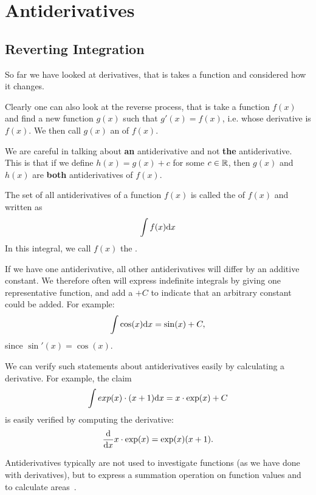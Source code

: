 \chapter{Antiderivatives}
\label{chanti}
\section{Reverting Integration}

So far we have looked at derivatives, that is takes a function and
considered how it changes.

Clearly one can also look at the reverse process, that is take a function
$f(x)$ and find a new function $g(x)$ such that $g'(x)=f(x)$, i.e. whose
derivative is $f(x)$. We then call $g(x)$ an  of
$f(x)$.

\begin{note}
We are careful in talking about \textbf{an} antiderivative and not
\textbf{the} antiderivative. This is that if we define $h(x)=g(x)+c$ for
some $c\in{\mathbb R}$, then $g(x)$ and $h(x)$ are \textbf{both} antiderivatives of
$f(x)$.
\end{note}

\begin{defn}
The set of all antiderivatives of a function $f(x)$ is called the
 of $f(x)$ and written as
\[
\int f(x){\mbox{d}}x
\]
In this integral, we call $f(x)$ the .
\end{defn}

If we have one antiderivative, all other antiderivatives will differ by an
additive constant. We therefore often will express indefinite
integrals by giving one representative function, and add a $+C$ to indicate
that an arbitrary constant could be added. For example:
\[
\int \cos(x){\mbox{d}}x=\sin(x)+C,
\]
since $\sin'(x)=\cos(x)$.
\smallskip

We can verify such statements about antiderivatives easily by calculating a
derivative. For example, the claim
\[
\int exp(x)\cdot (x+1){\mbox{d}}x=x\cdot\exp(x)+C
\]
is easily verified by computing the derivative:
\[
\frac{\mbox{d}}{\mbox{d}x} x\cdot\exp(x)=\exp(x)(x+1).
\]
\medskip

Antiderivatives typically are not used to investigate functions (as we have
done with derivatives), but to express a summation operation on function
values and to calculate areas~.

